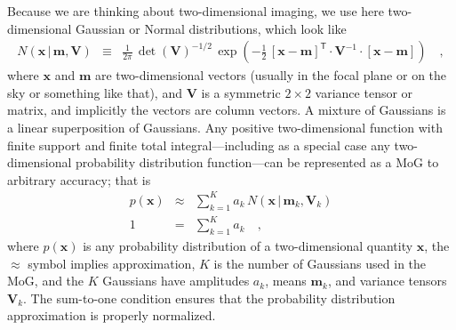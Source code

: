 \documentclass[12pt,pdftex,preprint]{aastex}
\newcommand{\tmatrix}[1]{\boldsymbol{#1}}
\newcommand{\inverse}[1]{{#1}^{-1}}
\newcommand{\transpose}[1]{{#1}^{\mathsf T}}
\newcommand{\tvector}[1]{\boldsymbol{#1}}
\newcommand{\pos}{\tvector{x}}
\newcommand{\mean}{\tvector{m}}
\newcommand{\var}{\tmatrix{V}}
\newcommand{\normal}{N}
\newcommand{\given}{\,|\,}
\begin{document}
Because we are thinking about two-dimensional imaging, we use here
two-dimensional Gaussian or Normal distributions, which look like
\begin{eqnarray}\displaystyle
\normal(\pos\given\mean,\var) &\equiv& \frac{1}{2\pi}\,\det(\var)^{-1/2}\,\exp(-\frac{1}{2}\,\transpose{[\pos-\mean]}\cdot\inverse{\var}\cdot[\pos-\mean])
\quad ,
\end{eqnarray}
where $\pos$ and $\mean$ are two-dimensional vectors (usually in the
focal plane or on the sky or something like that), and $\var$ is a
symmetric $2\times 2$ variance tensor or matrix, and implicitly the
vectors are column vectors.  A mixture of Gaussians is a linear
superposition of Gaussians.  Any positive two-dimensional function
with finite support and finite total integral---including as a special
case any two-dimensional probability distribution function---can be
represented as a MoG to arbitrary accuracy; that is
\begin{eqnarray}
p(\pos) &\approx& \sum_{k=1}^K a_k\,\normal(\pos\given\mean_k,\var_k)
\\
1 &=& \sum_{k=1}^K a_k
\quad ,
\end{eqnarray}
where $p(\pos)$ is any probability distribution of a two-dimensional
quantity $\pos$, the $\approx$ symbol implies approximation, $K$ is
the number of Gaussians used in the MoG, and the $K$ Gaussians
have amplitudes $a_k$, means $\mean_k$, and variance tensors $\var_k$.
The sum-to-one condition ensures that the probability distribution
approximation is properly normalized.
\end{document}
